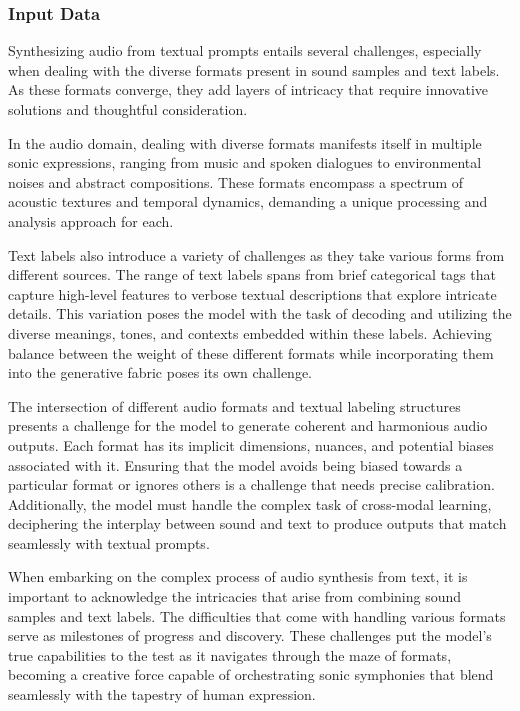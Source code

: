 \subsubsection{Input Data}

Synthesizing audio from textual prompts entails several challenges, especially when dealing with the diverse formats present in sound samples and text labels. As these formats converge, they add layers of intricacy that require innovative solutions and thoughtful consideration.

In the audio domain, dealing with diverse formats manifests itself in multiple sonic expressions, ranging from music and spoken dialogues to environmental noises and abstract compositions. These formats encompass a spectrum of acoustic textures and temporal dynamics, demanding a unique processing and analysis approach for each.

Text labels also introduce a variety of challenges as they take various forms from different sources. The range of text labels spans from brief categorical tags that capture high-level features to verbose textual descriptions that explore intricate details. This variation poses the model with the task of decoding and utilizing the diverse meanings, tones, and contexts embedded within these labels. Achieving balance between the weight of these different formats while incorporating them into the generative fabric poses its own challenge.

The intersection of different audio formats and textual labeling structures presents a challenge for the model to generate coherent and harmonious audio outputs. Each format has its implicit dimensions, nuances, and potential biases associated with it. Ensuring that the model avoids being biased towards a particular format or ignores others is a challenge that needs precise calibration. Additionally, the model must handle the complex task of cross-modal learning, deciphering the interplay between sound and text to produce outputs that match seamlessly with textual prompts.

When embarking on the complex process of audio synthesis from text, it is important to acknowledge the intricacies that arise from combining sound samples and text labels. The difficulties that come with handling various formats serve as milestones of progress and discovery. These challenges put the model's true capabilities to the test as it navigates through the maze of formats, becoming a creative force capable of orchestrating sonic symphonies that blend seamlessly with the tapestry of human expression.

